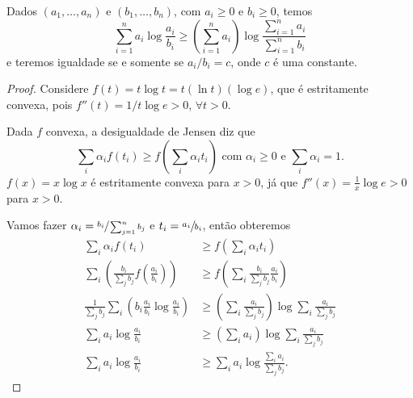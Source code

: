 \begin{proposition}\label{prop:ineq-sum-log}
Dados $(a_1, \ldots, a_n)$ e $(b_1,\ldots,b_n)$, com $a_i \geq 0$ e $b_i \geq 0$, temos
\begin{equation}\label{eq:dessomalog}
\sum_{i=1}^n a_i \log \frac{a_i}{b_i} \geq \left( \sum_{i=1}^n a_i \right) \log \frac{\sum_{i=1}^n a_i}{\sum_{i=1}^n b_i}
\end{equation}
e teremos igualdade se e somente se $a_i/b_i = c$, onde $c$ é uma constante.
\end{proposition}
\begin{proof}
Considere $f(t) = t \log t = t (\ln t) (\log e)$, que é estritamente convexa, pois
$f''(t) = 1/t \log e >0$, $\forall t > 0$.

Dada $f$ convexa, a desigualdade de Jensen diz que
\begin{equation}
\sum_i \alpha_i f(t_i) \geq f \left( \sum_i \alpha_i t_i \right) \text{ com } \alpha_i \geq 0 \text{ e } \sum_i \alpha_i = 1.
\end{equation}
$f(x) = x \log x$ é estritamente convexa para $x>0$, já que $f''(x)=\frac{1}{x} \log e > 0$ para $x>0$.

Vamos fazer $\alpha_i = \sfrac{b_i}{\sum_{j=1}^n b_j}$ e $t_i = \sfrac{a_i}{b_i}$, então obteremos
\begin{subequations}
    \begin{align}
	\sum_i \alpha_i f(t_i) &\geq f \left( \sum_i \alpha_i t_i \right) \\
	\sum_i \left( \frac{b_i}{\sum_j b_j} f \left( \frac{a_i}{b_i} \right) \right) &\geq f \left( \sum_i \frac{b_i}{\sum_j b_j} \frac{a_i}{b_i} \right) \\
	\frac{1}{\sum_j b_j} \sum_i \left( b_i \frac{a_i}{b_i} \log \frac{a_i}{b_i} \right) &\geq \left( \sum_i \frac{a_i}{\sum_j b_j} \right) \log \sum_i \frac{a_i}{\sum_j b_j} \\
	\sum_i a_i \log \frac{a_i}{b_i} &\geq \left( \sum_i a_i \right) \log \sum_i \frac{a_i}{\sum_j b_j} \\
	\sum_i a_i \log \frac{a_i}{b_i} &\geq \sum_i a_i \log \frac{\sum_i a_i}{\sum_j b_j} .
    \end{align}
\end{subequations}
\end{proof}

